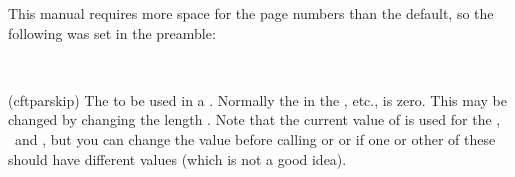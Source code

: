     This manual requires more space for the page numbers than the default,
so the following was set in the preamble:
\begin{lcode}
\setpnumwidth{2.55em}
\setrmarg{3.55em}
\end{lcode}


\begin{syntax}
\lnc{\cftparskip} \\
\end{syntax}
\glossary(cftparskip)%
  {}%
  {The  to be used in a \listofx.}
 Normally the \lnc{\parskip} in the \toc, etc., is zero. This may be changed
 by changing the length \lnc{\cftparskip}. Note that the current value
 of \lnc{\cftparskip} is used for the \toc, \lof\ and \lot, but you can change
 the value before calling \cmd{\tableofcontents} or \cmd{\listoffigures} or
 \cmd{\listoftables} if one or other of these should have different values
 (which is not a good idea).


